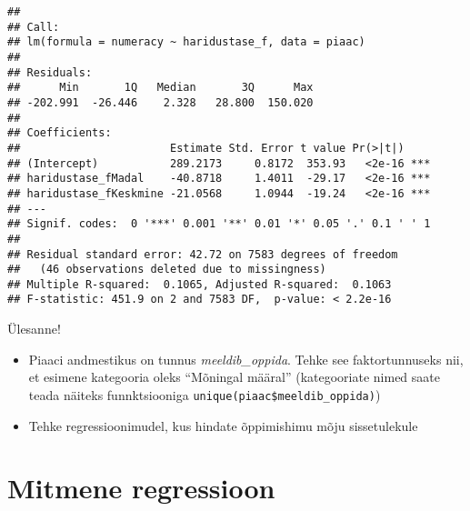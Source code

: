 \documentclass[
]{book}
\newenvironment{Shaded}{\begin{snugshade}}{\end{snugshade}}
\newcommand{\AttributeTok}[1]{\textcolor[rgb]{0.77,0.63,0.00}{#1}}
\newcommand{\CommentTok}[1]{\textcolor[rgb]{0.56,0.35,0.01}{\textit{#1}}}
\newcommand{\FunctionTok}[1]{\textcolor[rgb]{0.00,0.00,0.00}{#1}}
\newcommand{\NormalTok}[1]{#1}
\newcommand{\OtherTok}[1]{\textcolor[rgb]{0.56,0.35,0.01}{#1}}
\newcommand{\SpecialCharTok}[1]{\textcolor[rgb]{0.00,0.00,0.00}{#1}}
\newcommand{\StringTok}[1]{\textcolor[rgb]{0.31,0.60,0.02}{#1}}
\providecommand{\tightlist}{%
  \setlength{\itemsep}{0pt}\setlength{\parskip}{0pt}}
\begin{document}
\begin{Shaded}
\end{Shaded}

\begin{verbatim}
## 
## Call:
## lm(formula = numeracy ~ haridustase_f, data = piaac)
## 
## Residuals:
##      Min       1Q   Median       3Q      Max 
## -202.991  -26.446    2.328   28.800  150.020 
## 
## Coefficients:
##                       Estimate Std. Error t value Pr(>|t|)    
## (Intercept)           289.2173     0.8172  353.93   <2e-16 ***
## haridustase_fMadal    -40.8718     1.4011  -29.17   <2e-16 ***
## haridustase_fKeskmine -21.0568     1.0944  -19.24   <2e-16 ***
## ---
## Signif. codes:  0 '***' 0.001 '**' 0.01 '*' 0.05 '.' 0.1 ' ' 1
## 
## Residual standard error: 42.72 on 7583 degrees of freedom
##   (46 observations deleted due to missingness)
## Multiple R-squared:  0.1065, Adjusted R-squared:  0.1063 
## F-statistic: 451.9 on 2 and 7583 DF,  p-value: < 2.2e-16
\end{verbatim}

Ülesanne!

\begin{itemize}
\tightlist
\item
  Piaaci andmestikus on tunnus \emph{meeldib\_oppida}. Tehke see faktortunnuseks nii, et esimene kategooria oleks ``Mõningal määral'' (kategooriate nimed saate teada näiteks funnktsiooniga \texttt{unique(piaac\$meeldib\_oppida)})
\item
  Tehke regressioonimudel, kus hindate õppimishimu mõju sissetulekule
\end{itemize}

\hypertarget{mitmene-regressioon}{%
\section{Mitmene regressioon}\label{mitmene-regressioon}}
\end{document}
